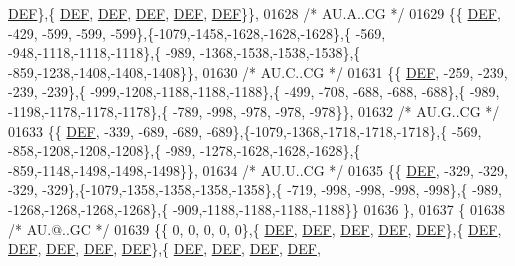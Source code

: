 \begin{DoxyCode}
      \mbox{\hyperlink{1_88_84__epars_8h_a397419fc12b37ed479c8abb9d444d843}{DEF}}\},\{  \mbox{\hyperlink{1_88_84__epars_8h_a397419fc12b37ed479c8abb9d444d843}{DEF}},  \mbox{\hyperlink{1_88_84__epars_8h_a397419fc12b37ed479c8abb9d444d843}{DEF}},  \mbox{\hyperlink{1_88_84__epars_8h_a397419fc12b37ed479c8abb9d444d843}{DEF}},  \mbox{\hyperlink{1_88_84__epars_8h_a397419fc12b37ed479c8abb9d444d843}{DEF}},  \mbox{\hyperlink{1_88_84__epars_8h_a397419fc12b37ed479c8abb9d444d843}{DEF}}\}\},
01628 \textcolor{comment}{/* AU.A..CG */}
01629 \{\{  \mbox{\hyperlink{1_88_84__epars_8h_a397419fc12b37ed479c8abb9d444d843}{DEF}}, -429, -599, -599, -599\},\{-1079,-1458,-1628,-1628,-1628\},\{ -569, -948,-1118,-1118,-1118\},\{ -989,
      -1368,-1538,-1538,-1538\},\{ -859,-1238,-1408,-1408,-1408\}\},
01630 \textcolor{comment}{/* AU.C..CG */}
01631 \{\{  \mbox{\hyperlink{1_88_84__epars_8h_a397419fc12b37ed479c8abb9d444d843}{DEF}}, -259, -239, -239, -239\},\{ -999,-1208,-1188,-1188,-1188\},\{ -499, -708, -688, -688, -688\},\{ -989,
      -1198,-1178,-1178,-1178\},\{ -789, -998, -978, -978, -978\}\},
01632 \textcolor{comment}{/* AU.G..CG */}
01633 \{\{  \mbox{\hyperlink{1_88_84__epars_8h_a397419fc12b37ed479c8abb9d444d843}{DEF}}, -339, -689, -689, -689\},\{-1079,-1368,-1718,-1718,-1718\},\{ -569, -858,-1208,-1208,-1208\},\{ -989,
      -1278,-1628,-1628,-1628\},\{ -859,-1148,-1498,-1498,-1498\}\},
01634 \textcolor{comment}{/* AU.U..CG */}
01635 \{\{  \mbox{\hyperlink{1_88_84__epars_8h_a397419fc12b37ed479c8abb9d444d843}{DEF}}, -329, -329, -329, -329\},\{-1079,-1358,-1358,-1358,-1358\},\{ -719, -998, -998, -998, -998\},\{ -989,
      -1268,-1268,-1268,-1268\},\{ -909,-1188,-1188,-1188,-1188\}\}
01636 \},
01637 \{
01638 \textcolor{comment}{/* AU.@..GC */}
01639 \{\{    0,    0,    0,    0,    0\},\{  \mbox{\hyperlink{1_88_84__epars_8h_a397419fc12b37ed479c8abb9d444d843}{DEF}},  \mbox{\hyperlink{1_88_84__epars_8h_a397419fc12b37ed479c8abb9d444d843}{DEF}},  \mbox{\hyperlink{1_88_84__epars_8h_a397419fc12b37ed479c8abb9d444d843}{DEF}},  \mbox{\hyperlink{1_88_84__epars_8h_a397419fc12b37ed479c8abb9d444d843}{DEF}},  \mbox{\hyperlink{1_88_84__epars_8h_a397419fc12b37ed479c8abb9d444d843}{DEF}}\},\{  
      \mbox{\hyperlink{1_88_84__epars_8h_a397419fc12b37ed479c8abb9d444d843}{DEF}},  \mbox{\hyperlink{1_88_84__epars_8h_a397419fc12b37ed479c8abb9d444d843}{DEF}},  \mbox{\hyperlink{1_88_84__epars_8h_a397419fc12b37ed479c8abb9d444d843}{DEF}},  \mbox{\hyperlink{1_88_84__epars_8h_a397419fc12b37ed479c8abb9d444d843}{DEF}},  \mbox{\hyperlink{1_88_84__epars_8h_a397419fc12b37ed479c8abb9d444d843}{DEF}}\},\{  \mbox{\hyperlink{1_88_84__epars_8h_a397419fc12b37ed479c8abb9d444d843}{DEF}},  \mbox{\hyperlink{1_88_84__epars_8h_a397419fc12b37ed479c8abb9d444d843}{DEF}},  \mbox{\hyperlink{1_88_84__epars_8h_a397419fc12b37ed479c8abb9d444d843}{DEF}},  \mbox{\hyperlink{1_88_84__epars_8h_a397419fc12b37ed479c8abb9d444d843}{DEF}},  

\end{DoxyCode}
